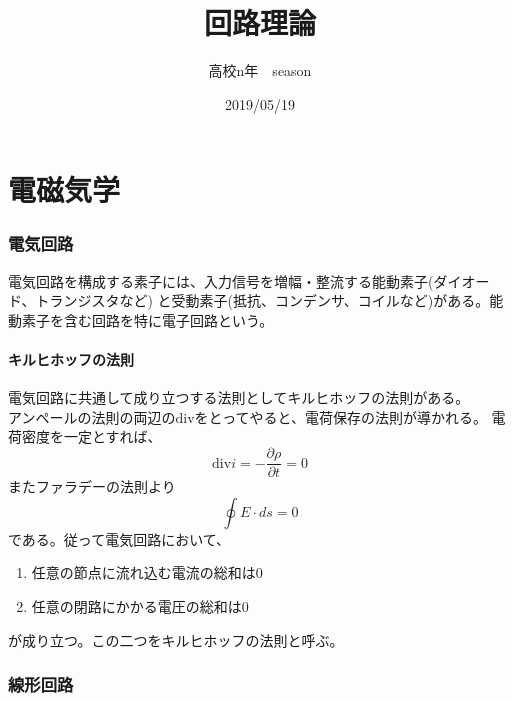 \documentclass{jsarticle}
\begin{document}
\title{回路理論}
\author{高校n年　season}
\date{2019/05/19}
\maketitle
\newcommand{\repart}[1]{\part{#1}\setcounter{section}{0}}
\newcommand{\lr}[1]{\left(#1 \right)}
\newcommand{\mlr}[1]{\left\{#1 \right\}}
\newcommand{\llr}[1]{\left[#1 \right]}
\newcommand{\vlr}[1]{\left|#1 \right|}%
\newcommand{\rec}[1]{\frac{1}{#1}}
\newcommand{\de}[2][]{\frac{d #1}{d #2}}
\newcommand{\pd}[2][]{\frac{\partial #1}{\partial #2}}
\newcommand{\ppd}[3]{\frac{\partial^2 #1}{\partial #2\partial #3}}
\newcommand{\pmat}[1]{\begin{pmatrix} #1 \end{pmatrix}}
\newcommand{\lp}{\mathcal{L}}
\newcommand{\grad}{\mathrm{grad}}
\newcommand{\dive}{\mathrm{div}}
\newcommand{\rot}{\mathrm{rot}}
\newcommand{\pa}{\partial}
\newcommand{\na}{\nabla}
\repart{電磁気学}
    \section{電気回路}
        電気回路を構成する素子には、入力信号を増幅・整流する能動素子(ダイオード、トランジスタなど)
        と受動素子(抵抗、コンデンサ、コイルなど)がある。能動素子を含む回路を特に電子回路という。
        \subsection{キルヒホッフの法則}
            電気回路に共通して成り立つする法則としてキルヒホッフの法則がある。\\
            アンペールの法則の両辺の$\dive$をとってやると、電荷保存の法則が導かれる。
            電荷密度を一定とすれば、
                \[\dive i = -\pd[\rho]{t} = 0\]
            またファラデーの法則より
                \[\oint E\cdot ds = 0\]
            である。従って電気回路において、
            \begin{enumerate}
                \item 任意の節点に流れ込む電流の総和は0
                \item 任意の閉路にかかる電圧の総和は0
            \end{enumerate}
            が成り立つ。この二つをキルヒホッフの法則と呼ぶ。
    \section{線形回路}
\end{document}
